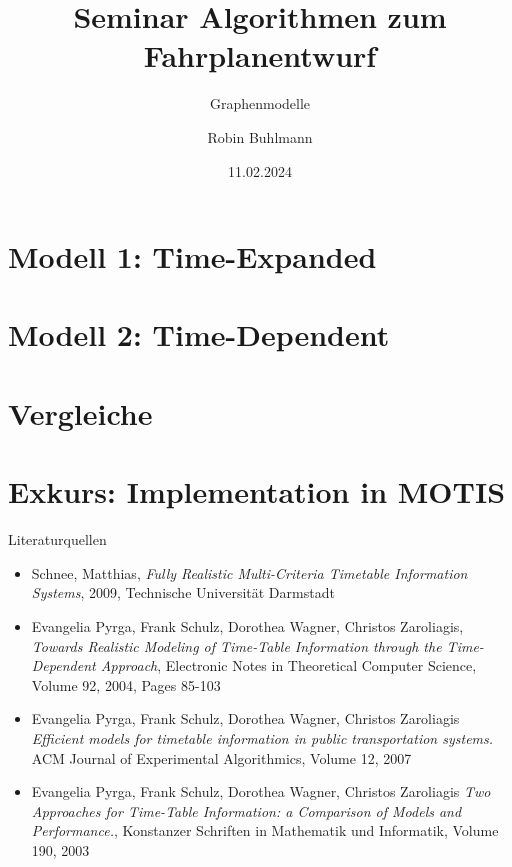 \documentclass[
	ngerman,
	aspectratio=43,
	color={accentcolor=11c},
	logo=false,
	colorframetitle=false,
	]{tudabeamer}
\title{Seminar Algorithmen zum Fahrplanentwurf}
\subtitle{Graphenmodelle}
\author[R. Buhlmann]{Robin Buhlmann}
\date{11.02.2024}
\begin{document}
\maketitle



\section{Modell 1: Time-Expanded}


\section{Modell 2: Time-Dependent}


\section{Vergleiche}


\section{Exkurs: Implementation in MOTIS}





\begin{frame}{Literaturquellen}
	\begin{itemize}
		\item Schnee, Matthias, \textit{Fully Realistic Multi-Criteria Timetable Information Systems}, 2009, Technische Universität Darmstadt
		\item Evangelia Pyrga, Frank Schulz, Dorothea Wagner, Christos Zaroliagis, \textit{Towards Realistic Modeling of Time-Table Information through the Time-Dependent Approach}, Electronic Notes in Theoretical Computer Science, Volume 92, 2004, Pages 85-103
		\item Evangelia Pyrga, Frank Schulz, Dorothea Wagner, Christos Zaroliagis \textit{Efficient models for timetable information in public transportation systems.} ACM Journal of Experimental Algorithmics, Volume 12, 2007
		\item Evangelia Pyrga, Frank Schulz, Dorothea Wagner, Christos Zaroliagis  \textit{Two Approaches for Time-Table Information: a Comparison of Models and Performance.}, Konstanzer Schriften in Mathematik und Informatik, Volume 190, 2003
\end{itemize}
\end{frame}
\end{document}
